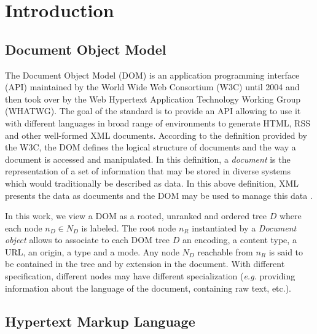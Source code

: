\section{Introduction}
\label{sec:hpath-introduction}

\subsection{Document Object Model}
\label{sec:hpath-introduction-DOM}

The Document Object Model (DOM) is an application programming interface (API) maintained by the World Wide Web Consortium (W3C) until 2004 and then took over by the Web Hypertext Application Technology Working Group (WHATWG). The goal of the standard is to provide an API allowing to use it with different languages in broad range of environments to generate HTML, RSS and other well-formed XML documents. According to the definition provided by the W3C, the DOM defines the logical structure of documents and the way a document is accessed and manipulated. In this definition, a \emph{document} is the representation of a set of information that may be stored in diverse systems which would traditionally be described as data. In this above definition, XML presents the data as documents and the DOM may be used to manage this data \cite{W3C2004}.

In this work, we view a DOM as a rooted, unranked and ordered tree $D$ where each node $n_D \in N_D$ is labeled. The root node $n_R$ instantiated by a \emph{Document object} allows to associate to each DOM tree $D$ an encoding, a content type, a URL, an origin, a type and a mode. Any node $N_D$ reachable from $n_R$ is said to be contained in the tree and by extension in the document. With different specification, different nodes may have different specialization (\emph{e.g.} providing information about the language of the document, containing raw text, etc.).

\subsection{Hypertext Markup Language}
\label{sec:hpath-introduction-HTML}

